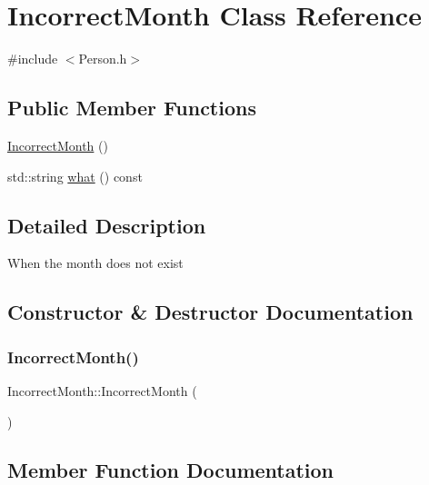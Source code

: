 \hypertarget{class_incorrect_month}{}\section{Incorrect\+Month Class Reference}
\label{class_incorrect_month}


{\ttfamily \#include $<$Person.\+h$>$}

\subsection*{Public Member Functions}
\begin{DoxyCompactItemize}
\item 
\mbox{\hyperlink{class_incorrect_month_aa26c2dc9c6804ba2645861c92b71d3d5}{Incorrect\+Month}} ()
\item 
std\+::string \mbox{\hyperlink{class_incorrect_month_ab5f69a2380802c07d44f2f1c5e6575ed}{what}} () const
\end{DoxyCompactItemize}


\subsection{Detailed Description}
When the month does not exist 

\subsection{Constructor \& Destructor Documentation}
\mbox{\label{class_incorrect_month_aa26c2dc9c6804ba2645861c92b71d3d5}} 
\subsubsection{\texorpdfstring{Incorrect\+Month()}{IncorrectMonth()}}
{\footnotesize\ttfamily Incorrect\+Month\+::\+Incorrect\+Month (\begin{DoxyParamCaption}{ }\end{DoxyParamCaption})\hspace{0.3cm}{\ttfamily [inline]}}



\subsection{Member Function Documentation}
\mbox{\label{class_incorrect_month_ab5f69a2380802c07d44f2f1c5e6575ed}} 
